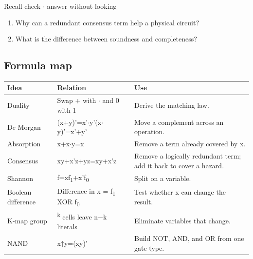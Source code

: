 \documentclass[11pt]{article}
\begin{document}
\begin{keepsection}
\begin{keepsection}
\begin{recallbox}{Recall check \ensuremath{\cdot} answer without looking}
\begin{enumerate}
\item Why can a redundant consensus term help a physical circuit?
\item What is the difference between soundness and completeness?
\end{enumerate}

\end{recallbox}
\end{keepsection}
\end{keepsection}

\begin{keepsection}
\section{Formula map}

\begin{center}\small\begin{tabularx}{\linewidth}{>{\raggedright\arraybackslash}X>{\raggedright\arraybackslash}X>{\raggedright\arraybackslash}X}\toprule
\textbf{Idea} & \textbf{Relation} & \textbf{Use} \\ \midrule
Duality & Swap + with \ensuremath{\cdot} and 0 with 1 & Derive the matching law. \\
De Morgan & (x+y)'=x'\ensuremath{\cdot}y'(x\ensuremath{\cdot}y)'=x'+y' & Move a complement across an operation. \\
Absorption & x+x\ensuremath{\cdot}y=x & Remove a term already covered by x. \\
Consensus & xy+x'z+yz=xy+x'z & Remove a logically redundant term; add it back to cover a hazard. \\
Shannon & f=xf\textsubscript{1}+x'f\textsubscript{0} & Split on a variable. \\
Boolean difference & Difference in x = f\textsubscript{1} XOR f\textsubscript{0} & Test whether x can change the result. \\
K-map group & 2\textsuperscript{k} cells leave n\ensuremath{-}k literals & Eliminate variables that change. \\
NAND & x↑y=(xy)' & Build NOT, AND, and OR from one gate type. \\
\bottomrule\end{tabularx}\end{center}
\end{keepsection}
\end{document}

